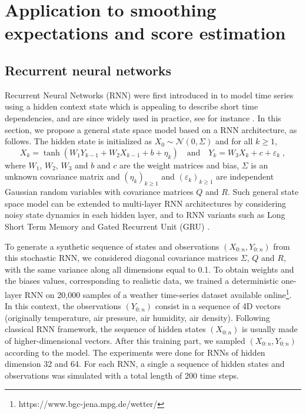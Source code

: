 \documentclass{article}
\newcommand{\eqsp}{\;}
\begin{document}
\section{Application to smoothing expectations and score estimation}
\label{sec:application}

\subsection{Recurrent neural networks}
\label{sec:simu:RNN}


Recurrent Neural Networks (RNN) were first introduced in \cite{Mozer1989AFB} to model time series using a hidden context state  which is appealing to describe short time dependencies, and are since widely used  in practice, see for instance \cite{mikolov2010recurrent, sutskever2011generating, sutskever2014sequence}. %
 In this section, we propose a general state space model based on a RNN architecture, as follows.  
 The hidden state is initialized as $X_0 \sim \mathcal{N}(0,\Sigma)$ and for all $k\geqslant 1$,
$$
X_k = \tanh(W_{1} Y_{k-1} + W_{2} X_{k-1} + b + \eta_k)\quad\mathrm{and} \quad Y_k = W_{3} X_{k}  + c + \varepsilon_k\eqsp,
$$
where $W_{1}$, $W_{2}$, $W_3$ and $b$ and $c$ are the weight matrices and bias,  $\Sigma$ is an unknown covariance matrix and $(\eta_k)_{k\geqslant 1}$ and $(\varepsilon_k)_{k\geqslant 1}$ are independent Gaussian random variables with covariance matrices $Q$ and $R$.
 Such general state space model can be extended to multi-layer RNN architectures by considering noisy state dynamics in each hidden layer, and to RNN variants such as Long Short Term Memory  \cite{Hochreiter1997LongSM} and Gated Recurrent Unit (GRU) \cite{Cho2014LearningPR}.
 
 To generate a synthetic sequence of states and observations $(X_{0:n},Y_{0:n})$ from this stochastic RNN, we considered diagonal covariance matrices $\Sigma$, $Q$ and $R$, with the same variance along all dimensions equal to 0.1. 
 To obtain weights and the biases values, corresponding to realistic data, we  trained a deterministic one-layer RNN on 20,000 samples of a weather time-series dataset available online\footnote{https://www.bgc-jena.mpg.de/wetter/}. 
 In this context, the observations $(Y_{0:n})$ consist in a sequence of 4D vectors (originally temperature, air pressure, air humidity, air density).
Following classical RNN framework,  the sequence of hidden states $(X_{0:n})$ is usually made of higher-dimensional vectors. 
After this training part, we sampled $(X_{0:n}, Y_{0:n})$ according to the model. 
The experiments were done for RNNs of hidden dimension 32 and 64. For each RNN,  a single  a sequence of  hidden states and  observations was simulated with a total length of 200 time steps.
 
\end{document}
